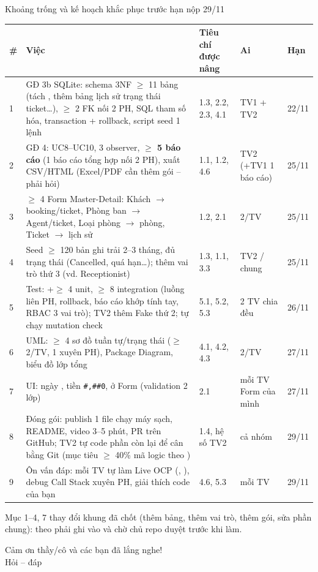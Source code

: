 \begin{frame}{Khoảng trống và kế hoạch khắc phục trước hạn nộp 29/11}
\tiny
\begin{tabularx}{\textwidth}{@{}L{0.35cm}YL{2.3cm}L{1.2cm}L{1.0cm}@{}}
\toprule
\textbf{\#} & \textbf{Việc} & \textbf{Tiêu chí được nâng} & \textbf{Ai} & \textbf{Hạn} \\
 & GĐ 3b SQLite: schema 3NF $\ge$ 11 bảng (tách , thêm bảng lịch sử trạng thái ticket\ldots), $\ge$ 2 FK nối 2 PH, SQL tham số hóa, transaction + rollback, script seed 1 lệnh & 1.3, 2.2, 2.3, 4.1 & TV1 + TV2 & 22/11 \\
2 & GĐ 4: UC8--UC10, 3 observer, \textbf{$\ge$ 5 báo cáo} (1 báo cáo tổng hợp nối 2 PH), xuất CSV/HTML (Excel/PDF cần thêm gói -- phải hỏi) & 1.1, 1.2, 4.6 & TV2 (+TV1 1 báo cáo) & 25/11 \\
3 & $\ge$ 4 Form Master-Detail: Khách $\to$ booking/ticket, Phòng ban $\to$ Agent/ticket, Loại phòng $\to$ phòng, Ticket $\to$ lịch sử & 1.2, 2.1 & 2/TV & 25/11 \\
4 & Seed $\ge$ 120 bản ghi trải 2--3 tháng, đủ trạng thái (Cancelled, quá hạn\ldots); thêm vai trò thứ 3 (vd. Receptionist) & 1.3, 1.1, 3.3 & TV2 / chung & 25/11 \\
5 & Test: +$\ge$ 4 unit, $\ge$ 8 integration (luồng liên PH, rollback, báo cáo khớp tính tay, RBAC 3 vai trò); TV2 thêm Fake thứ 2; tự chạy mutation check & 5.1, 5.2, 5.3 & 2 TV chia đều & 26/11 \\
6 & UML: $\ge$ 4 sơ đồ tuần tự/trạng thái ($\ge$ 2/TV, 1 xuyên PH), Package Diagram, biểu đồ lớp tổng  & 4.1, 4.2, 4.3 & 2/TV & 27/11 \\
7 & UI: ngày , tiền \texttt{\#,\#\#0}, ở Form (validation 2 lớp) & 2.1 & mỗi TV Form của mình & 27/11 \\
8 & Đóng gói: publish 1 file chạy máy sạch, README, video 3--5 phút, PR trên GitHub; TV2 tự code phần còn lại để cân bằng Git (mục tiêu $\ge$ 40\% mã logic theo ) & 1.4, hệ số TV2 & cả nhóm & 29/11 \\
9 & Ôn vấn đáp: mỗi TV tự làm Live OCP (, ), debug Call Stack xuyên PH, giải thích code của bạn & 4.6, 5.3 & mỗi TV & 29/11 \\
\bottomrule
\end{tabularx}

\vspace{1mm}
{\tiny Mục 1--4, 7 thay đổi khung đã chốt (thêm bảng, thêm vai trò, thêm gói, sửa phần chung): theo  phải ghi vào  và chờ chủ repo duyệt trước khi làm.\par}
\end{frame}

\begin{frame}[standout]
Cảm ơn thầy/cô và các bạn đã lắng nghe!\\[4mm]
{\normalsize Hỏi -- đáp}
\end{frame}
